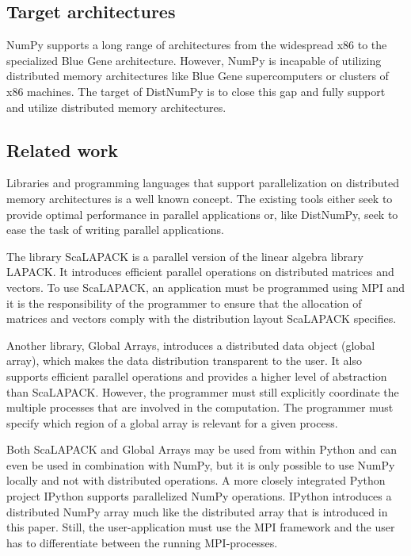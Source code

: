 \documentclass{sigplanconf}
\begin{document}
\subsection{Target architectures}
NumPy supports a long range of architectures from the widespread x86 to the specialized Blue Gene architecture. However, NumPy is incapable of utilizing distributed memory architectures like Blue Gene supercomputers or clusters of x86 machines. The target of DistNumPy is to close this gap and fully support and utilize distributed memory architectures. 


\subsection{Related work}
Libraries and programming languages that support parallelization on distributed memory architectures is a well known concept. The existing tools either seek to provide optimal performance in parallel applications or, like DistNumPy, seek to ease the task of writing parallel applications.

The library ScaLAPACK\cite{Blackford96} is a parallel version of the linear algebra library LAPACK\cite{lapack90}. It introduces efficient parallel operations on distributed matrices and vectors. To use ScaLAPACK, an application must be programmed using MPI\cite{mpi} and it is the responsibility of the programmer to ensure that the allocation of matrices and vectors comply with the distribution layout ScaLAPACK specifies.

Another library, Global Arrays\cite{Nieplocha96}, introduces a distributed data object (global array), which makes the data distribution transparent to the user. It also supports efficient parallel operations and provides a higher level of abstraction than ScaLAPACK. However, the programmer must still explicitly coordinate the multiple processes that are involved in the computation. The programmer must specify which region of a global array is relevant for a given process.

Both ScaLAPACK and Global Arrays may be used from within Python and can even be used in combination with NumPy, but it is only possible to use NumPy locally and not with distributed operations. A more closely integrated Python project IPython\cite{PER-GRA:2007} supports parallelized NumPy operations. IPython introduces a distributed NumPy array much like the distributed array that is introduced in this paper. Still, the user-application must use the MPI framework and the user has to differentiate between the running MPI-processes.
\end{document}
